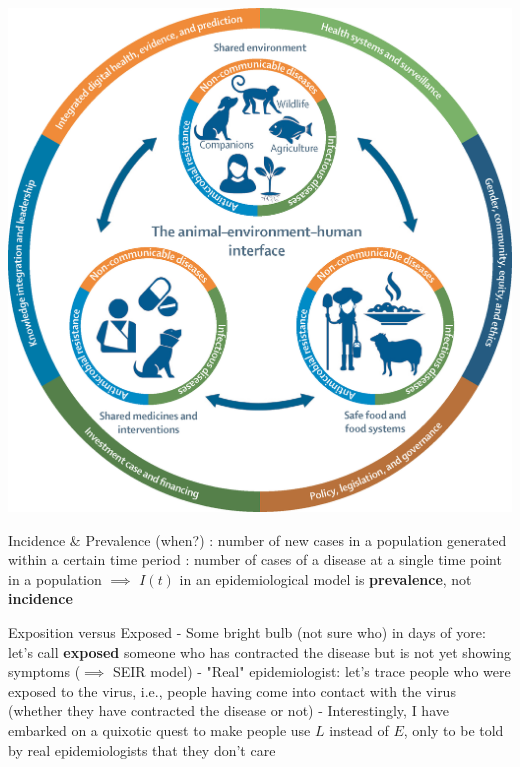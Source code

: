 \documentclass[aspectratio=169]{beamer}\usepackage[]{graphicx}\usepackage[]{xcolor}
\begin{document}
\begin{frame}
    \centering
    \includegraphics[height=\textheight]{FIGS/gr1_lrg.jpg}
\end{frame}


\begin{frame}{Incidence \& Prevalence (when?)}
: number of new cases in a population generated within a certain time period
\vfill
{}: number of cases of a disease at a single time point in a population
\vfill
$\implies$ $I(t)$ in an epidemiological model is \textbf{prevalence}, not \textbf{incidence}
\end{frame}

\begin{frame}{Exposition versus Exposed}
- Some bright bulb (not sure who) in days of yore: let's call \textbf{exposed} someone who has contracted the disease but is not yet showing symptoms ($\implies$ SEIR model)
\vfill
- "Real" epidemiologist: let's trace people who were exposed to the virus, i.e., people having come into contact with the virus (whether they have contracted the disease or not)
\vfill
- Interestingly, I have embarked on a quixotic quest to make people use $L$ instead of $E$, only to be told by real epidemiologists that they don't care \code{:)}
\end{frame}
\end{document}
